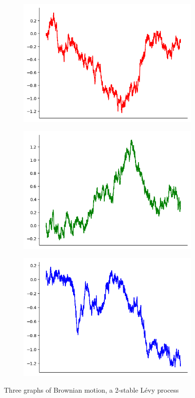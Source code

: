 \begin{figure}[htbp]
	\centering
	\begin{subfigure}{0.3\textwidth}
		\centering
		\includegraphics[width=0.85\linewidth]{pics/ch-brownian/2-brownianr.png}
	\end{subfigure}%
	\begin{subfigure}{.3\textwidth}
		\centering
		\includegraphics[width=.9\linewidth]{pics/ch-brownian/2-browniang.png}
	\end{subfigure}%
	\begin{subfigure}{.3\textwidth}
		\centering
		\includegraphics[width=.9\linewidth]{pics/ch-brownian/2-brownianb.png}
	\end{subfigure}
	\caption{Three graphs of Brownian motion, a 2-stable L\'evy process}
	\label{fig:brownian}
\end{figure}




